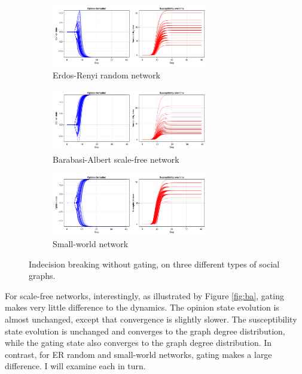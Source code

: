 \documentclass[]{article}
\begin{document}
\begin{figure}
	\begin{subfigure}{\linewidth}
		\centering
		\includegraphics[width=0.75\textwidth]{../plots/nvar0_nog_homd_hisig_g05_ER4_s92391} 
		\caption{Erdos-Renyi random network}  \label{fig:ng1}
	\end{subfigure}
	
	\begin{subfigure}{\linewidth}
		\centering
		\includegraphics[width=0.75\textwidth]{../plots/nvar0_nog_homd_hisig_g05_BA3_s92391}
		\caption{Barabasi-Albert scale-free network} \label{fig:ng2}
	\end{subfigure}
	
	\begin{subfigure}{\linewidth}
		\centering
		\includegraphics[width=0.75\textwidth]{../plots/nvar0_nog_homd_hisig_g05_WS4_s92391} 
		\caption{Small-world network}  \label{fig:ng3}
	\end{subfigure}
	
	\caption{Indecision breaking without gating, on three different types of social graphs.}
	\label{fig:ng}
\end{figure}

For scale-free networks, interestingly, as illustrated by Figure \ref{fig:ba}, gating makes very little difference to the dynamics. The opinion state evolution is almost unchanged, except that convergence is slightly slower. The susceptibility state evolution is unchanged and converges to the graph degree distribution, while the gating state also converges to the graph degree distribution. In contrast, for ER random and small-world networks, gating makes a large difference. I will examine each in turn.
\end{document}
